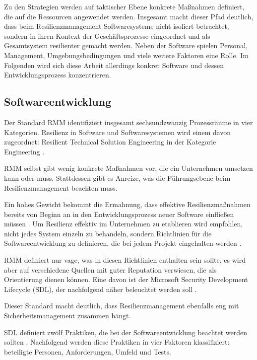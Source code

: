 \documentclass[]{lni}
\begin{document}
Zu den Strategien werden auf taktischer Ebene konkrete Maßnahmen definiert, die auf die Ressourcen angewendet werden. Insgesamt macht dieser Pfad deutlich, dass beim Resilienzmanagement Softwaresysteme nicht isoliert betrachtet, sondern in ihren Kontext der Geschäftsprozesse eingeordnet und als Gesamtsystem resilienter gemacht werden. Neben der Software spielen Personal, Management, Umgebungsbedingungen und viele weitere Faktoren eine Rolle. Im Folgenden wird sich diese Arbeit allerdings konkret Software und dessen Entwicklungsprozess konzentrieren.

\subsection*{Softwareentwicklung} \label{placement-software}

Der Standard RMM identifiziert insgesamt sechsundzwanzig Prozessräume in vier Kategorien. Resilienz in Software und Softwaresystemen wird einem davon zugeordnet: \glqq Resilient Technical Solution Engineering\grqq{} in der Kategorie \glqq Engineering\grqq{} \cite[31]{CERT_RMM}.

RMM selbst gibt wenig konkrete Maßnahmen vor, die ein Unternehmen umsetzen kann oder muss. Stattdessen gibt es Anreize, was die Führungsebene beim Resilienzmanagement beachten muss. 

Ein hohes Gewicht bekommt die Ermahnung, dass effektive Resilienzmaßnahmen bereits von Beginn an in den Entwicklungsprozess neuer Software einfließen müssen \cite[178]{CERT_RMM}. Um Resilienz effektiv im Unternehmen zu etablieren wird empfohlen, nicht jedes System einzeln zu behandeln, sondern Richtlinien für die Softwareentwicklung zu definieren, die bei jedem Projekt eingehalten werden \cite[179]{CERT_RMM}.

RMM definiert nur vage, was in diesen Richtlinien enthalten sein sollte, es wird aber auf verschiedene Quellen mit guter Reputation verwiesen, die als Orientierung dienen können. Eine davon ist der Microsoft Security Development Lifecycle (SDL), der nachfolgend näher beleuchtet werden soll \cite[180]{CERT_RMM}.  

Dieser Standard macht deutlich, dass Resilienzmanagement ebenfalls eng mit Sicherheitsmanagement zusammen hängt.

SDL definiert zwölf Praktiken, die bei der Softwareentwicklung beachtet werden sollten \cite{MSDL}. Nachfolgend werden diese Praktiken in vier Faktoren klassifiziert: beteiligte Personen, Anforderungen, Umfeld und Tests.
\end{document}
